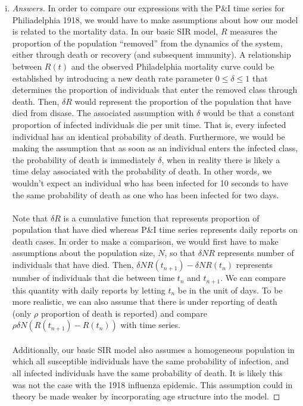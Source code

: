 \documentclass[12pt]{article}
\begin{document}
\begin{enumerate}[(a)]
\begin{enumerate}[(i)]
  \item \basicSIRanalQbiii

{\color{blue}
\begin{proof}[Answers]
In order to compare our expressions with the P\&I time series for Philiadelphia 1918, we would have to make assumptions about how our model is related to the mortality data. 
In our basic SIR model, $R$ measures the proportion of the population ``removed'' from the dynamics of the system, either through death or recovery (and subsequent immunity). A relationship between $R(t)$ and the observed Philadelphia mortality curve could be established by introducing a new death rate parameter $0 \leq \delta \leq 1$ that determines the proportion of individuals that enter the removed class through death.
Then, $\delta R$ would represent the proportion of the population that have died from disase.
The associated assumption with $\delta$ would be that a constant proportion of infected individuals die per unit time. That is, every infected individual has an identical probability of death. Furthermore, we would be making the assumption that as soon as an individual enters the infected class, the probability of death is immediately $\delta$, when in reality there is likely a time delay associated with the probability of death. In other words, we wouldn't expect an individual who has been infected for 10 seconds to have the same probability of death as one who has been infected for two days.
\\\\
Note that $\delta R$ is a cumulative function that represents proportion of population that have died whereas P\&I time series represents daily reports on death cases. 
In order to make a comparison, we would first have to make assumptions about the population size, $N$, so that $\delta N R$ represents number of individuals that have died.
Then, $\delta N R (t_{n+1}) - \delta N R (t_n)$ represents number of individuals that die between time $t_n$ and $t_{n+1}$. 
We can compare this quantity with daily reports by letting $t_n$ be in the unit of days.
To be more realistic, we can also assume that there is under reporting of death (only $\rho$ proportion of death is reported) and compare $\rho \delta N (R(t_{n+1}) - R(t_n))$ with time series.
\\\\
Additionally, our basic SIR model also assumes a homogeneous population in which all susceptible individuals have the same probability of infection, and all infected individuals have the same probability of death. It is likely this was not the case with the 1918 influenza epidemic. This assumption could in theory be made weaker by incorporating age structure into the model.

\end{proof}}
\end{enumerate}
\end{enumerate}
\end{document}
